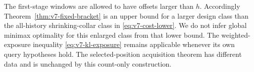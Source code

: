 The first-stage windows are allowed to have offsets larger than $h$.
Accordingly Theorem~\ref{thm:v7-fixed-bracket} is an upper bound for a
larger design class than the all-history shrinking-collar class in
\eqref{eq:v7-cost-lower}. We do not infer global minimax optimality
for this enlarged class from that lower bound. The weighted-exposure
inequality \eqref{eq:v7-kl-exposure} remains applicable whenever its
own query hypotheses hold. The selected-position acquisition theorem
has different data and is unchanged by this count-only construction.
